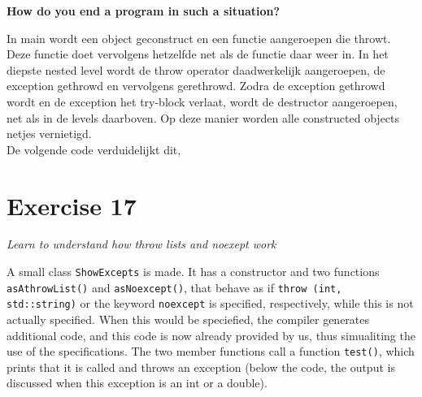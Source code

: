 \documentclass[12pt]{article}
\newcommand{\desc}[1]{\textit{#1} \vspace{1em}}
\begin{document}
\textbf{How do you end a program in such a situation?}

In main wordt een object geconstruct en een functie aangeroepen die throwt. Deze functie doet vervolgens hetzelfde net als de functie daar weer in. In het diepste nested level wordt de throw operator daadwerkelijk aangeroepen, de exception gethrowd en vervolgens gerethrowd. Zodra de exception gethrowd wordt en de exception het try-block verlaat, wordt de destructor aangeroepen, net als in de levels daarboven.
Op deze manier worden alle constructed objects netjes vernietigd.\\

De volgende code verduidelijkt dit,











\clearpage
\section*{Exercise 17}
\desc{Learn to understand how throw lists and noexept work}

A small class \texttt{ShowExcepts} is made. It has a constructor and two functions \texttt{asAthrowList()} and \texttt{asNoexcept()}, that behave as if \texttt{throw (int, std::string)} or the keyword \texttt{noexcept} is specified, respectively, while this is not actually specified. When this would be speciefied, the compiler generates additional code, and this code is now already provided by us, thus simualiting the use of the specifications. 
The two member functions call a function \texttt{test()}, which prints that it is called and throws an exception (below the code, the output is discussed when this exception is an int or a double). 










\end{document}
